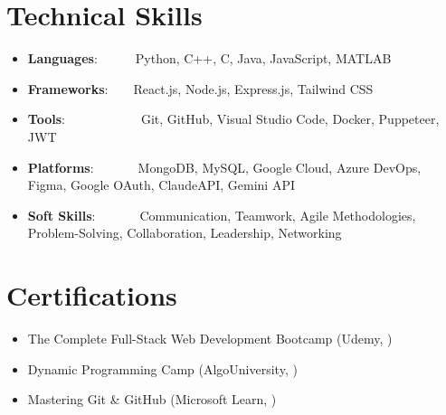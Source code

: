 \documentclass[a4paper,10pt]{article}
\newcommand{\resumeItem}[2]{
  \item{
    \textbf{#1}{:\hspace{0.5mm}#2 \vspace{-0.5mm}}
  }
}
\newcommand{\resumeSubItem}[2]{\resumeItem{#1}{#2}\vspace{-4pt}}
\newcommand{\resumeHeadingSkillStart}{\begin{itemize}[leftmargin=*,itemsep=1.7mm, rightmargin=2ex]}
\newcommand{\resumeItemListStart}{\begin{justify}\begin{itemize}[leftmargin=3ex, rightmargin=2ex, noitemsep,labelsep=1.2mm,itemsep=0mm]\small}
\newcommand{\resumeHeadingSkillEnd}{\end{itemize}\vspace{-2mm}}
\newcommand{\resumeItemListEnd}{\end{itemize}\end{justify}\vspace{-2mm}}
\begin{document}
\section{\textbf{Technical Skills}}
\resumeHeadingSkillStart

\resumeSubItem{Languages}{~~~~~~Python, C++, C, Java, JavaScript, MATLAB
}
\resumeSubItem{Frameworks}{~~~~React.js, Node.js, Express.js, Tailwind CSS
}
\resumeSubItem{Tools}{~~~~~~~~~~~~Git, GitHub, Visual Studio Code, Docker, Puppeteer, JWT
}
\resumeSubItem{Platforms}{~~~~~~~MongoDB, MySQL, Google Cloud, Azure DevOps, Figma, Google OAuth, ClaudeAPI, Gemini API
}
\resumeSubItem{Soft Skills}{~~~~~~~Communication, Teamwork, Agile Methodologies, Problem-Solving, Collaboration, Leadership, Networking
}

\resumeHeadingSkillEnd

\vspace{-1.5mm}

\vspace{-1mm}

\section{\textbf{Certifications}}
    \resumeItemListStart
\item The Complete Full-Stack Web Development Bootcamp (Udemy, )
\item Dynamic Programming Camp (AlgoUniversity, )
\item Mastering Git \& GitHub (Microsoft Learn, )
    \resumeItemListEnd
\vspace{-4mm}
\end{document}
